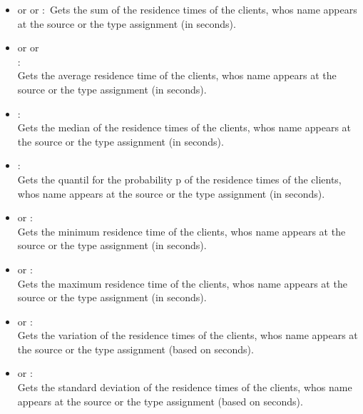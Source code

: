 \begin{itemize}

\item
{} or  or :\
Gets the sum of the residence times of the clients, whos name appears at the source or the type assignment  (in seconds).

\item
{} or  or\\ :\\
Gets the average residence time of the clients, whos name appears at the source or the type assignment  (in seconds).

\item
{}:\\
Gets the median of the residence times of the clients, whos name appears at the source or the type assignment  (in seconds).

\item
{}:\\
Gets the quantil for the probability p of the residence times of the clients, whos name appears at the source or the type assignment  (in seconds).

\item
{} or :\\
Gets the minimum residence time of the clients, whos name appears at the source or the type assignment  (in seconds).

\item
{} or :\\
Gets the maximum residence time of the clients, whos name appears at the source or the type assignment  (in seconds).

\item
{} or :\\
Gets the variation of the residence times of the clients, whos name appears at the source or the type assignment  (based on seconds).

\item
{} or :\\
Gets the standard deviation of the residence times of the clients, whos name appears at the source or the type assignment  (based on seconds).


\end{itemize}
